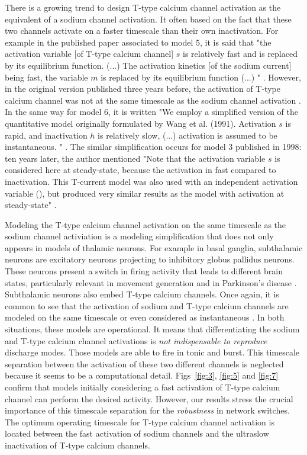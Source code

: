 There is a growing trend to design T-type calcium channel activation as the equivalent of a sodium channel activation. It often based on the fact that these two channels activate on a faster timescale than their own inactivation. For example in the published paper associated to model 5, it is said that "the activation variable [of T-type calcium channel] $s$ is relatively fast and is replaced by its equilibrium function. (...) The activation kinetics [of the sodium current] being fast, the variable $m$ is replaced by its equilibrium function (...) " \citep{wang_multiple_1994}. However, in the original version published three years before, the activation of T-type calcium channel was not at the same timescale as the sodium channel activation \citep{wang_model_1991}. In the same way for model 6, it is written "We employ a simplified version of the quantitative model originally formulated by Wang et al. (1991). Activation $s$ is rapid, and inactivation $h$ is relatively slow, (...) activation is assumed to be instantaneous. " \citep{rush_analysis_1994}. The similar simplification occurs for model 3 published in 1998: ten years later, the author mentioned "Note that the activation variable $s$ is considered here at steady-state, because the activation in fast compared to inactivation. This T-current model was also used with an independent activation variable (\citep{destexhe_dendritic_1998}), but produced very similar results as the model with activation at steady-state" \citep{pospischil_minimal_2008}. 

Modeling the T-type calcium channel activation on the same timescale as the sodium channel activiation is a modeling simplification that does not only appears in models of thalamic neurons. For example in basal ganglia, subthalamic neurons are excitatory neurons projecting to inhibitory globus pallidus neurons. These neurons present a switch in firing activity that leads to different brain states, particularly relevant in movement generation and in Parkinson's disease \citep{uhlhaas_neural_2006, bevan_move_2002, gatev_oscillations_2006, kuhn_event-related_2004, brown_basal_2005, swann_deep_2011}. Subthalamic neurons also embed T-type calcium channels. Once again, it is common to see that the activation of sodium and T-type calcium channels are modeled on the same timescale  or even considered as instantaneous \citep{kubota_nmda-induced_2011, terman_activity_2002, rubin_high_2004}. 
In both situations, these models are operational. It means that differentiating the sodium and T-type calcium channel activations is \textit{not indispensable to reproduce} discharge modes. Those models are able to fire in tonic and burst. This timescale separation between the activation of these two different channels is neglected because it seems to be a computational detail.  Figs~\ref{fig:3},  \ref{fig:5} and \ref{fig:7} confirm that models initially considering a fast activation of T-type calcium channel can perform the desired activity.  However, our results stress the crucial importance of this timescale separation for the \textit{robustness} in network switches.  The optimum operating timescale for T-type calcium channel activation is located between the fast activation of sodium channels and the ultraslow inactivation of T-type calcium channels. 

